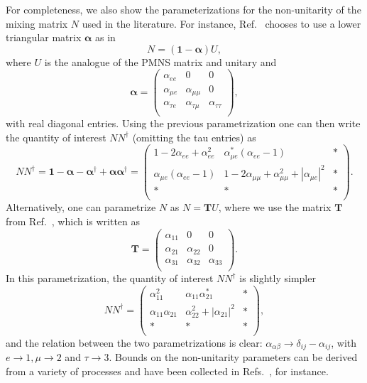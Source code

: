 For completeness, we also show the parameterizations for the non-unitarity of the mixing matrix $N$ used in the literature. For instance, Ref.~\cite{Blennow:2016jkn} chooses to use a lower triangular matrix $\boldsymbol{\alpha}$ as in
\begin{equation}
 N = (\boldsymbol{1} - \boldsymbol{\alpha}) U,
\end{equation}
where $U$ is the analogue of the PMNS matrix and unitary and 
\[
\boldsymbol{\alpha} =
  \begin{pmatrix}
    \alpha_{e e} & 0 & 0 \\
    \alpha_{\mu e} & \alpha_{\mu \mu} & 0 \\
    \alpha_{\tau e} & \alpha_{\tau \mu} & \alpha_{\tau \tau} \\
  \end{pmatrix},
\]
with real diagonal entries. Using the previous parametrization one can then write the quantity of interest $NN^{\dagger}$ (omitting the tau entries) as 
%
\begin{equation}
 NN^{\dagger} = \boldsymbol{1} - \boldsymbol{\alpha} - \boldsymbol{\alpha}^{\dagger} + \boldsymbol{\alpha}\boldsymbol{\alpha}^{\dagger} =\begin{pmatrix}
    1 - 2\alpha_{e e} +\alpha_{e e}^2 & \alpha_{\mu e}^*(\alpha_{ee}-1) & * \\
    \alpha_{\mu e}(\alpha_{ee}-1) & 1 - 2\alpha_{\mu \mu} + \alpha_{\mu \mu}^2 + |\alpha_{\mu e}|^2 & * \\
    * & * & * \\
  \end{pmatrix}.
\end{equation}
%
Alternatively, one can parametrize $N$ as $N = \boldsymbol{T} U$, where we use the matrix $\boldsymbol{T}$ from Ref.~\cite{Escrihuela2015}, which is written as
%
\begin{equation}
\boldsymbol{T} =
  \begin{pmatrix}
    \alpha_{11} & 0 & 0 \\
    \alpha_{21} & \alpha_{22} & 0 \\
    \alpha_{31} & \alpha_{32} & \alpha_{33} \\
  \end{pmatrix}.
\end{equation}
%
In this parametrization, the quantity of interest $NN^{\dagger}$ is slightly simpler
\begin{equation}
NN^{\dagger} =
  \begin{pmatrix}
    \alpha_{11}^2 & \alpha_{11}\alpha_{21}^* & * \\
    \alpha_{11}\alpha_{21} & \alpha_{22}^2 + |\alpha_{21}|^2 & * \\
    * & * & * \\
  \end{pmatrix},
\end{equation}
and the relation between the two parametrizations is clear: $\alpha_{\alpha \beta} \to \delta_{ij} - \alpha_{ij}$, with $e \to 1, \mu \to 2$ and $\tau \to 3$. Bounds on the non-unitarity parameters can be derived from a variety of processes and have been collected in Refs.~\cite{Fernandez-Martinez:2016lgt}, for instance.

